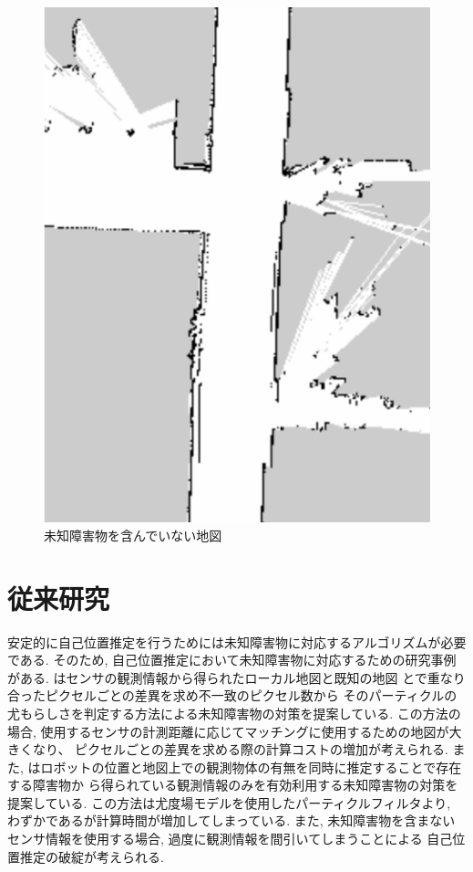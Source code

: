 \begin{figure}[htbp]
\begin{minipage}[b]{0.5\linewidth}
    \includegraphics[keepaspectratio, scale=0.32]{figs/known_obstacles.png}
    \caption{未知障害物を含んでいない地図}
    \label{fig:known-obstacles}
  \end{minipage}
\end{figure}


\section{従来研究}

安定的に自己位置推定を行うためには未知障害物に対応するアルゴリズムが必要である.
そのため, 自己位置推定において未知障害物に対応するための研究事例\cite{富沢2012}\cite{赤井2019}がある. 
\cite{富沢2012}はセンサの観測情報から得られたローカル地図と既知の地図
とで重なり合ったピクセルごとの差異を求め不一致のピクセル数から
そのパーティクルの尤もらしさを判定する方法による未知障害物の対策を提案している. 
この方法の場合, 使用するセンサの計測距離に応じてマッチングに使用するための地図が大きくなり、
ピクセルごとの差異を求める際の計算コストの増加が考えられる. 
また, \cite{赤井2019}はロボットの位置と地図上での観測物体の有無を同時に推定することで存在する障害物か
ら得られている観測情報のみを有効利用する未知障害物の対策を提案している. 
この方法は尤度場モデルを使用したパーティクルフィルタより, わずかであるが計算時間が増加してしまっている. 
また, 未知障害物を含まないセンサ情報を使用する場合, 過度に観測情報を間引いてしまうことによる
自己位置推定の破綻が考えられる. 

